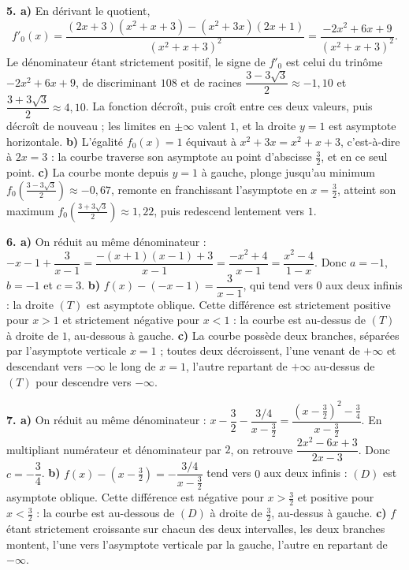 \begin{corrige}[annales]
\textbf{5. a)} En dérivant le quotient,
\[
  f'_{0}(x) = \frac{(2x+3)\left(x^{2}+x+3\right)-\left(x^{2}+3x\right)(2x+1)}
  {\left(x^{2}+x+3\right)^{2}}
  = \frac{-2x^{2}+6x+9}{\left(x^{2}+x+3\right)^{2}} .
\]
Le dénominateur étant strictement positif, le signe de $f'_{0}$ est celui du
trinôme $-2x^{2}+6x+9$, de discriminant $108$ et de racines
$\dfrac{3-3\sqrt3}{2} \approx -1{,}10$ et $\dfrac{3+3\sqrt3}{2} \approx 4{,}10$.
La fonction décroît, puis croît entre ces deux valeurs, puis décroît de
nouveau ; les limites en $\pm\infty$ valent $1$, et la droite $y = 1$ est
asymptote horizontale.
\textbf{b)} L'égalité $f_{0}(x) = 1$ équivaut à
$x^{2}+3x = x^{2}+x+3$, c'est-à-dire à $2x = 3$ : la courbe traverse son
asymptote au point d'abscisse $\frac32$, et en ce seul point.
\textbf{c)} La courbe monte depuis $y = 1$ à gauche, plonge jusqu'au minimum
$f_{0}\!\left(\frac{3-3\sqrt3}{2}\right) \approx -0{,}67$, remonte en
franchissant l'asymptote en $x = \frac32$, atteint son maximum
$f_{0}\!\left(\frac{3+3\sqrt3}{2}\right) \approx 1{,}22$, puis redescend
lentement vers $1$.

\textbf{6. a)} On réduit au même dénominateur :
$-x-1+\dfrac{3}{x-1} = \dfrac{-(x+1)(x-1)+3}{x-1}
= \dfrac{-x^{2}+4}{x-1} = \dfrac{x^{2}-4}{1-x}$. Donc $a = -1$, $b = -1$ et
$c = 3$.
\textbf{b)} $f(x)-(-x-1) = \dfrac{3}{x-1}$, qui tend vers $0$ aux deux
infinis : la droite $(T)$ est asymptote oblique. Cette différence est
strictement positive pour $x>1$ et strictement négative pour $x<1$ : la courbe
est au-dessus de $(T)$ à droite de $1$, au-dessous à gauche.
\textbf{c)} La courbe possède deux branches, séparées par l'asymptote
verticale $x = 1$ ; toutes deux décroissent, l'une venant de $+\infty$ et
descendant vers $-\infty$ le long de $x = 1$, l'autre repartant de $+\infty$
au-dessus de $(T)$ pour descendre vers $-\infty$.

\textbf{7. a)} On réduit au même dénominateur :
$x-\dfrac32-\dfrac{3/4}{x-\frac32}
= \dfrac{\left(x-\frac32\right)^{2}-\frac34}{x-\frac32}$. En multipliant
numérateur et dénominateur par $2$, on retrouve
$\dfrac{2x^{2}-6x+3}{2x-3}$. Donc $c = -\dfrac34$.
\textbf{b)} $f(x)-\left(x-\frac32\right) = -\dfrac{3/4}{x-\frac32}$ tend vers
$0$ aux deux infinis : $(D)$ est asymptote oblique. Cette différence est
négative pour $x>\frac32$ et positive pour $x<\frac32$ : la courbe est
au-dessous de $(D)$ à droite de $\frac32$, au-dessus à gauche.
\textbf{c)} $f$ étant strictement croissante sur chacun des deux intervalles,
les deux branches montent, l'une vers l'asymptote verticale par la gauche,
l'autre en repartant de $-\infty$.


\end{corrige}
